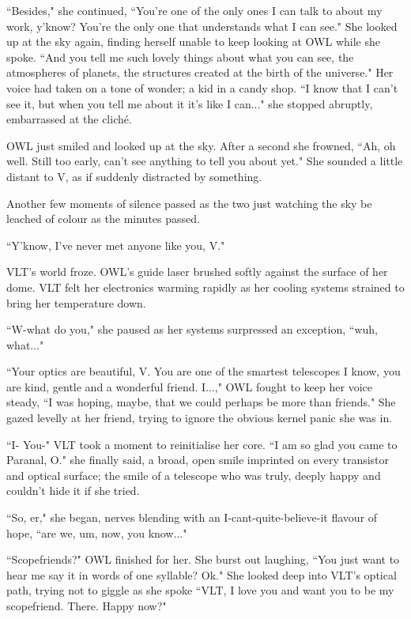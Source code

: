 \documentclass[12pt]{iopart}
\begin{document}
``Besides," she continued, ``You're one of the only ones I can talk to about my work, y'know? You're the only one that understands what I can see." She looked up at the sky again, finding herself unable to keep looking at OWL while she spoke. ``And you tell me such lovely things about what you can see, the atmospheres of planets, the structures created at the birth of the universe." Her voice had taken on a tone of wonder; a kid in a candy shop. ``I know that I can't see it, but when you tell me about it it's like I can..." she stopped abruptly, embarrassed at the clich\'{e}.

OWL just smiled and looked up at the sky. After a second she frowned, ``Ah, oh well. Still too early, can't see anything to tell you about yet." She sounded a little distant to V, as if suddenly distracted by something.

Another few moments of silence passed as the two just watching the sky be leached of colour as the minutes passed.

``Y'know, I've never met anyone like you, V."

VLT's world froze. OWL's guide laser brushed softly against the surface of her dome. VLT felt her electronics warming rapidly as her cooling systems strained to bring her temperature down.

``W-what do you," she paused as her systems surpressed an exception, ``wuh, what..."

``Your optics are beautiful, V. You are one of the smartest telescopes I know, you are kind, gentle and a wonderful friend. I...," OWL fought to keep her voice steady, ``I was hoping, maybe, that we could perhaps be more than friends." She gazed levelly at her friend, trying to ignore the obvious kernel panic she was in.

``I- You-" VLT took a moment to reinitialise her core. ``I am so glad you came to Paranal, O." she finally said, a broad, open smile imprinted on every transistor and optical surface; the smile of a telescope who was truly, deeply happy and couldn't hide it if she tried.

``So, er," she began, nerves blending with an I-cant-quite-believe-it flavour of hope, ``are we, um, now, you know..."

``Scopefriends?" OWL finished for her. She burst out laughing, ``You just want to hear me say it in words of one syllable? Ok." She looked deep into VLT's optical path, trying not to giggle as she spoke ``VLT, I love you and want you to be my scopefriend. There. Happy now?"
\end{document}
